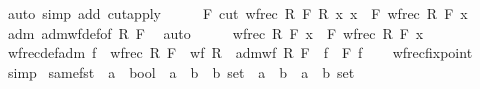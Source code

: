 \begin{isabellebody}
\ {\isacharparenleft}{\kern0pt}auto\ simp\ add{\isacharcolon}{\kern0pt}\ cut{\isacharunderscore}{\kern0pt}apply{\isacharparenright}{\kern0pt}\isanewline
\ \ \isamarkupfalse%
\ \isamarkupfalse%
\ {\isachardoublequoteopen}F\ {\isacharparenleft}{\kern0pt}cut\ {\isacharparenleft}{\kern0pt}wfrec\ R\ F{\isacharparenright}{\kern0pt}\ R\ x{\isacharparenright}{\kern0pt}\ x\ {\isacharequal}{\kern0pt}\ F\ {\isacharparenleft}{\kern0pt}wfrec\ R\ F{\isacharparenright}{\kern0pt}\ x{\isachardoublequoteclose}\isanewline
\ \ \ \ \isamarkupfalse%
\ adm\ adm{\isacharunderscore}{\kern0pt}wf{\isacharunderscore}{\kern0pt}def{\isacharbrackleft}{\kern0pt}of\ R\ F{\isacharbrackright}{\kern0pt}\ \isamarkupfalse%
\ auto\isanewline
\ \ \isamarkupfalse%
\ \isamarkupfalse%
\ {\isachardoublequoteopen}wfrec\ R\ F\ x\ {\isacharequal}{\kern0pt}\ F\ {\isacharparenleft}{\kern0pt}wfrec\ R\ F{\isacharparenright}{\kern0pt}\ x{\isachardoublequoteclose}\ \isacommand{{\isachardot}{\kern0pt}}\isamarkupfalse%
\isanewline
{}\isamarkupfalse%
%
\endisatagproof
{\isafoldproof}%
%
\isadelimproof
\isanewline
%
\endisadelimproof
\isanewline
{}\isamarkupfalse%
\ wfrec{\isacharunderscore}{\kern0pt}def{\isacharunderscore}{\kern0pt}adm{\isacharcolon}{\kern0pt}\ {\isachardoublequoteopen}f\ {\isasymequiv}\ wfrec\ R\ F\ {\isasymLongrightarrow}\ wf\ R\ {\isasymLongrightarrow}\ adm{\isacharunderscore}{\kern0pt}wf\ R\ F\ {\isasymLongrightarrow}\ f\ {\isacharequal}{\kern0pt}\ F\ f{\isachardoublequoteclose}\isanewline
%
\isadelimproof
\ \ %
\endisadelimproof
%
\isatagproof
{}\isamarkupfalse%
\ wfrec{\isacharunderscore}{\kern0pt}fixpoint\ \isamarkupfalse%
\ simp%
\endisatagproof
{\isafoldproof}%
%
\isadelimproof
%
\endisadelimproof
%
\isadelimdocument
%
\endisadelimdocument
%
\isatagdocument
%
\isamarkuptrue%
%
\endisatagdocument
{\isafolddocument}%
%
\isadelimdocument
%
\endisadelimdocument
{}\isamarkupfalse%
\ same{\isacharunderscore}{\kern0pt}fst\ {\isacharcolon}{\kern0pt}{\isacharcolon}{\kern0pt}\ {\isachardoublequoteopen}{\isacharparenleft}{\kern0pt}{\isacharprime}{\kern0pt}a\ {\isasymRightarrow}\ bool{\isacharparenright}{\kern0pt}\ {\isasymRightarrow}\ {\isacharparenleft}{\kern0pt}{\isacharprime}{\kern0pt}a\ {\isasymRightarrow}\ {\isacharparenleft}{\kern0pt}{\isacharprime}{\kern0pt}b\ {\isasymtimes}\ {\isacharprime}{\kern0pt}b{\isacharparenright}{\kern0pt}\ set{\isacharparenright}{\kern0pt}\ {\isasymRightarrow}\ {\isacharparenleft}{\kern0pt}{\isacharparenleft}{\kern0pt}{\isacharprime}{\kern0pt}a\ {\isasymtimes}\ {\isacharprime}{\kern0pt}b{\isacharparenright}{\kern0pt}\ {\isasymtimes}\ {\isacharparenleft}{\kern0pt}{\isacharprime}{\kern0pt}a\ {\isasymtimes}\ {\isacharprime}{\kern0pt}b{\isacharparenright}{\kern0pt}{\isacharparenright}{\kern0pt}\ set{\isachardoublequoteclose}\isanewline

\end{isabellebody}
